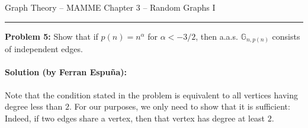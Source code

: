 \documentclass{amsart}
\theoremstyle{plain}
\theoremstyle{definition}
\begin{document}
    {\Large Graph Theory -- MAMME}
    {\Large Chapter 3 -- Random Graphs I}

    \vspace{0.5cm}

    \hrule

    \vspace{0.5cm}

    \noindent \textbf{Problem 5:}
    Show that if $p(n) = n^{\alpha}$ for $\alpha < -3/2$, then
    a.a.s. $\mathbb{G}_{n, p(n)}$ consists of independent edges.


    \paragraph{\textbf{Solution (by Ferran Espuña):}}
    Note that the condition stated in the problem is equivalent to
    all vertices having degree less than $2$.
    For our purposes, we only need to show that it is sufficient:
    Indeed, if two edges share a vertex, then that vertex has degree at least $2$.
\end{document}
